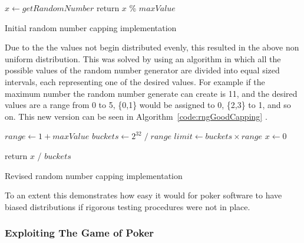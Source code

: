 \vspace{0.3cm}

\begin{algorithm}[H]
    \BlankLine{}
     $x \leftarrow getRandomNumber$\;
     return $x$ \% $maxValue$\;
\caption{Initial random number capping implementation}%
\label{code:rngBadCapping}
\end{algorithm}

\vspace{0.3cm}

Due to the the values not begin distributed evenly, this resulted in the
above non uniform distribution. This was solved by using an algorithm in which
all the possible values of the random number generator are divided into equal
sized intervals, each representing one of the desired values. For example
if the maximum number the random number generate can create is 11, and the
desired values are a range from 0 to 5, \{0,1\} would be assigned to 0, \{2,3\}
to 1, and so on. This new version can be seen in
Algorithm~\ref{code:rngGoodCapping} \parencite{website:reich2011}.

\vspace{0.3cm}

\begin{algorithm}[H]
    \BlankLine{}
     $range \leftarrow 1 + maxValue$\;
     $buckets \leftarrow {2}^{32}\; / \;range$\;
     $limit \leftarrow buckets \times range$\;
     $x \leftarrow 0$\;

     

     return $x$ / $buckets$\;
\caption{Revised random number capping implementation}%
\label{code:rngGoodCapping}
\end{algorithm}

\vspace{0.3cm}

To an extent this demonstrates how easy it would for poker software to have
biased distributions if rigorous testing procedures were not in place.

\subsubsection{Exploiting The Game of Poker}


